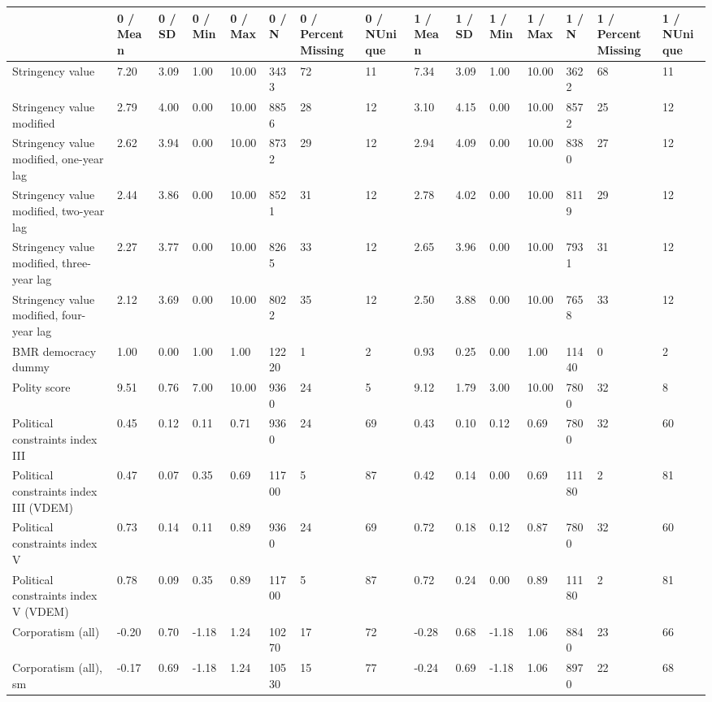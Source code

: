 
\begin{longtable}{lllllllllllllll}
\toprule
  & 0 / Mean & 0 / SD & 0 / Min & 0 / Max & 0 / N & 0 / PercentMissing & 0 / NUnique & 1 / Mean & 1 / SD & 1 / Min & 1 / Max & 1 / N & 1 / PercentMissing & 1 / NUnique\\
\midrule
Stringency value & 7.20 & 3.09 & 1.00 & 10.00 & 3433 & 72 & 11 & 7.34 & 3.09 & 1.00 & 10.00 & 3622 & 68 & 11\\
Stringency value modified & 2.79 & 4.00 & 0.00 & 10.00 & 8856 & 28 & 12 & 3.10 & 4.15 & 0.00 & 10.00 & 8572 & 25 & 12\\
Stringency value modified, one-year lag & 2.62 & 3.94 & 0.00 & 10.00 & 8732 & 29 & 12 & 2.94 & 4.09 & 0.00 & 10.00 & 8380 & 27 & 12\\
Stringency value modified, two-year lag & 2.44 & 3.86 & 0.00 & 10.00 & 8521 & 31 & 12 & 2.78 & 4.02 & 0.00 & 10.00 & 8119 & 29 & 12\\
Stringency value modified, three-year lag & 2.27 & 3.77 & 0.00 & 10.00 & 8265 & 33 & 12 & 2.65 & 3.96 & 0.00 & 10.00 & 7931 & 31 & 12\\
\addlinespace
Stringency value modified, four-year lag & 2.12 & 3.69 & 0.00 & 10.00 & 8022 & 35 & 12 & 2.50 & 3.88 & 0.00 & 10.00 & 7658 & 33 & 12\\
BMR democracy dummy & 1.00 & 0.00 & 1.00 & 1.00 & 12220 & 1 & 2 & 0.93 & 0.25 & 0.00 & 1.00 & 11440 & 0 & 2\\
Polity score & 9.51 & 0.76 & 7.00 & 10.00 & 9360 & 24 & 5 & 9.12 & 1.79 & 3.00 & 10.00 & 7800 & 32 & 8\\
Political constraints index III & 0.45 & 0.12 & 0.11 & 0.71 & 9360 & 24 & 69 & 0.43 & 0.10 & 0.12 & 0.69 & 7800 & 32 & 60\\
Political constraints index III (VDEM) & 0.47 & 0.07 & 0.35 & 0.69 & 11700 & 5 & 87 & 0.42 & 0.14 & 0.00 & 0.69 & 11180 & 2 & 81\\
\addlinespace
Political constraints index V & 0.73 & 0.14 & 0.11 & 0.89 & 9360 & 24 & 69 & 0.72 & 0.18 & 0.12 & 0.87 & 7800 & 32 & 60\\
Political constraints index V (VDEM) & 0.78 & 0.09 & 0.35 & 0.89 & 11700 & 5 & 87 & 0.72 & 0.24 & 0.00 & 0.89 & 11180 & 2 & 81\\
Corporatism (all) & -0.20 & 0.70 & -1.18 & 1.24 & 10270 & 17 & 72 & -0.28 & 0.68 & -1.18 & 1.06 & 8840 & 23 & 66\\
Corporatism (all), sm & -0.17 & 0.69 & -1.18 & 1.24 & 10530 & 15 & 77 & -0.24 & 0.69 & -1.18 & 1.06 & 8970 & 22 & 68\\

\end{longtable}
